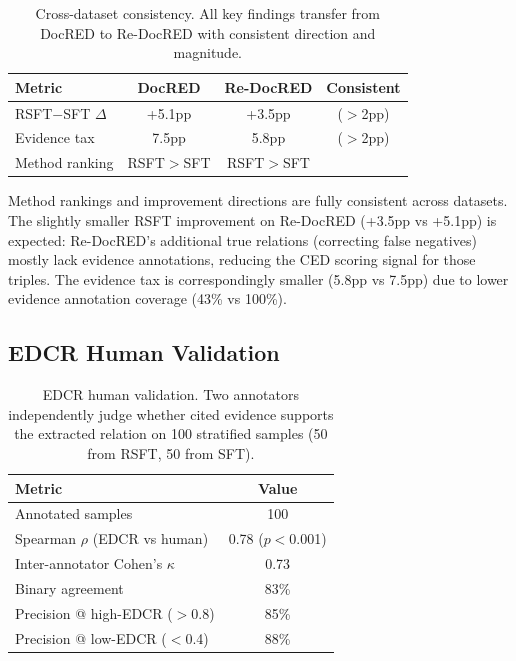 \documentclass[11pt]{article}
\renewcommand{\checkmark}{\ding{51}}
\begin{document}
\begin{table}[t]
\centering
\small
\begin{tabular}{lccc}
\toprule
\textbf{Metric} & \textbf{DocRED} & \textbf{Re-DocRED} & \textbf{Consistent} \\
\midrule
RSFT$-$SFT $\Delta$ & +5.1pp & +3.5pp & \checkmark ($>$2pp) \\
Evidence tax & 7.5pp & 5.8pp & \checkmark ($>$2pp) \\
Method ranking & RSFT$>$SFT & RSFT$>$SFT & \checkmark \\
\bottomrule
\end{tabular}
\caption{Cross-dataset consistency. All key findings transfer from DocRED to Re-DocRED with consistent direction and magnitude.}
\label{tab:consistency}
\end{table}

Method rankings and improvement directions are fully consistent across datasets. The slightly smaller RSFT improvement on Re-DocRED (+3.5pp vs +5.1pp) is expected: Re-DocRED's additional true relations (correcting false negatives) mostly lack evidence annotations, reducing the CED scoring signal for those triples. The evidence tax is correspondingly smaller (5.8pp vs 7.5pp) due to lower evidence annotation coverage (43\% vs 100\%).

\subsection{EDCR Human Validation}

\begin{table}[t]
\centering
\small
\begin{tabular}{lc}
\toprule
\textbf{Metric} & \textbf{Value} \\
\midrule
Annotated samples & 100 \\
Spearman $\rho$ (EDCR vs human) & 0.78 ($p<$0.001) \\
Inter-annotator Cohen's $\kappa$ & 0.73 \\
Binary agreement & 83\% \\
Precision @ high-EDCR ($>$0.8) & 85\% \\
Precision @ low-EDCR ($<$0.4) & 88\% \\
\bottomrule
\end{tabular}
\caption{EDCR human validation. Two annotators independently judge whether cited evidence supports the extracted relation on 100 stratified samples (50 from RSFT, 50 from SFT).}
\label{tab:human}
\end{table}
\end{document}
